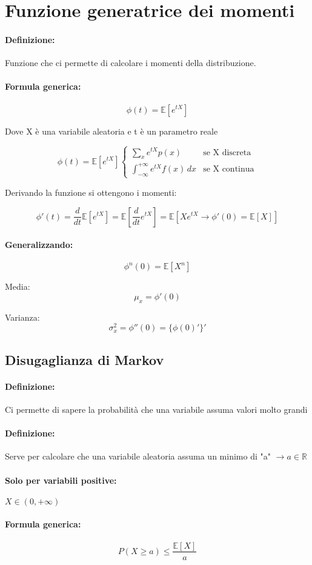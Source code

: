 \documentclass[]{article}
\newcommand{\ev}{\mathbb{E}[X]}
\renewcommand{\ev}[1]{\mathbb{E}[#1]}
\newcommand{\definizione}{\paragraph{Definizione:}}
\newcommand{\formula}{\paragraph{Formula generica:}}
\begin{document}
    \newpage
    \section{Funzione generatrice dei momenti}
    \definizione Funzione che ci permette di calcolare i momenti della distribuzione.
    \formula \[ \phi(t) = \ev{e^{tX}}\]
    \begin{center}
        Dove X è una variabile aleatoria e t è un parametro reale
    \end{center}

    \begin{equation*}
        \phi(t) = \ev{e^{tX}} 
        \begin{cases}
            \sum_{x}^{} e^{tX}p(x) & \text{se X discreta} \\
            \int_{-\infty}^{+\infty} e^{tX} f(x) \, dx & \text{se X continua}
        \end{cases}
    \end{equation*}
    \linebreak[10]
    \centerline{Derivando la funzione si ottengono i momenti:}
    \[ \phi'(t) = \frac{d}{dt} \ev{e^{tX}} = \ev{\frac{d}{dt} e^{tX}} = \ev{Xe^{tX} \longrightarrow \phi'(0) = \ev{X}}\]

    \paragraph{Generalizzando:}
    \[ \phi^{n}(0) = \ev{X^n} \]
    \linebreak[2]

    \begin{minipage}{0.45\linewidth}
        Media:
        \[\mu_x = \phi'(0)\]
    \end{minipage}
    \hfill
    \begin{minipage}{0.45\linewidth}
        Varianza:
        \[ \sigma^{2}_x = \phi''(0) = \{\phi(0)'\}' \]
    \end{minipage}
    \subsection{Disugaglianza di Markov}
    \definizione Ci permette di sapere la probabilità che una variabile assuma valori molto grandi
    \definizione Serve per calcolare che una variabile aleatoria assuma un minimo di "a" $\longrightarrow a \in \mathbb{R}$
    \paragraph{Solo per variabili positive:} $X \in (0, +\infty) $
    \formula \[ P(X \geq a) \leq \frac{\ev{X}}{a}\]
\end{document}

